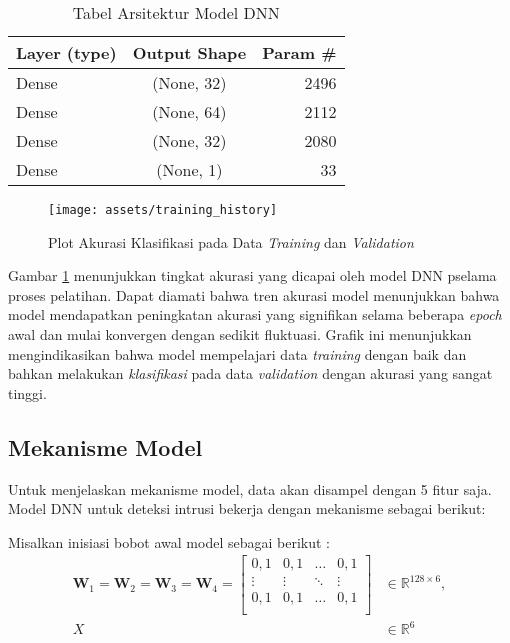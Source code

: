 \documentclass[a4paper,12pt]{report}
\begin{document}
\begin{longtable}{|l|  c|  r|}
	\caption{Tabel Arsitektur Model DNN}
	\label{tabel_arsitektur} \\
		\hline
		Layer (type) & Output Shape & Param \# \\
		\hline
		Dense & (None, 32) & 2496 \\
		\hline
		Dense & (None, 64) & 2112 \\
		\hline
		Dense & (None, 32) & 2080 \\
		\hline
		Dense & (None, 1) & 33 \\
		\hline
\end{longtable}
\begin{figure}[H]
	\texttt{[image: assets/training\_history]}
	\caption{Plot Akurasi Klasifikasi pada Data \textit{Training} dan \textit{Validation}}
	\label{training_history}
\end{figure}

Gambar \ref{training_history} menunjukkan tingkat akurasi yang dicapai oleh model DNN pselama proses pelatihan. Dapat diamati bahwa tren akurasi model menunjukkan bahwa model mendapatkan peningkatan akurasi yang signifikan selama beberapa \textit{epoch} awal dan mulai konvergen dengan sedikit fluktuasi. Grafik ini menunjukkan mengindikasikan bahwa model mempelajari data \textit{training} dengan baik dan bahkan melakukan \textit{klasifikasi} pada data \textit{validation} dengan akurasi yang sangat tinggi. 

\subsection{Mekanisme Model}
Untuk menjelaskan mekanisme model, data akan disampel dengan 5 fitur saja. Model DNN untuk deteksi intrusi bekerja dengan mekanisme sebagai berikut:

Misalkan inisiasi bobot awal model sebagai berikut :
\begin{equation}
	\begin{split}
		\mathbf{W}_{1} =\mathbf{W}_{2} = \mathbf{W}_{3} = \mathbf{W}_{4} = \begin{bmatrix}
			0,1 & 0,1 & \dots & 0,1 \\
			\vdots & \vdots & \ddots & \vdots \\
			0,1 & 0,1 & \dots & 0,1 \\
		\end{bmatrix} &\in \mathbb{R}^{128 \times 6}, \\
		X &\in \mathbb{R}^{6} \\
	\end{split}
\end{equation}
\end{document}
